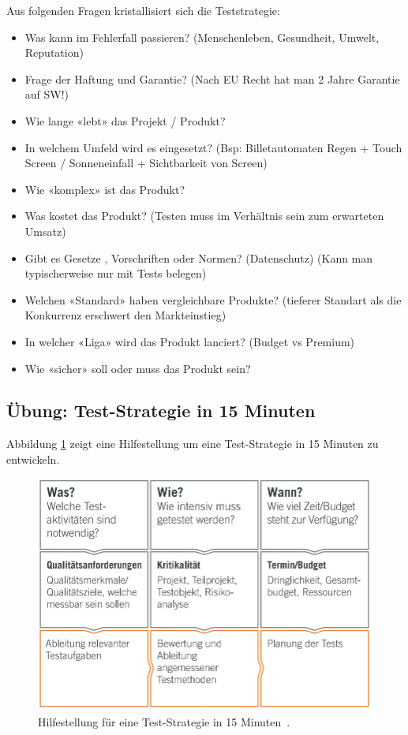 Aus folgenden Fragen kristallisiert sich die Teststrategie:
\begin{itemize}
    \item Was kann im Fehlerfall passieren? (Menschenleben, Gesundheit, Umwelt, Reputation)
    \item Frage der Haftung und Garantie? (Nach EU Recht hat man 2 Jahre Garantie auf SW!)
    \item Wie lange «lebt» das Projekt / Produkt?
    \item In welchem Umfeld wird es eingesetzt? (Bsp: Billetautomaten Regen + Touch Screen / Sonneneinfall + Sichtbarkeit von Screen)
    \item Wie «komplex» ist das Produkt?
    \item Was kostet das Produkt? (Testen muss im Verhältnis sein zum erwarteten Umsatz)
    \item Gibt es Gesetze , Vorschriften oder Normen? (Datenschutz) (Kann man typischerweise nur mit Tests belegen)
    \item Welchen «Standard» haben vergleichbare Produkte? (tieferer Standart als die Konkurrenz erschwert den Markteinstieg)
    \item In welcher «Liga» wird das Produkt lanciert? (Budget vs Premium)
    \item Wie «sicher» soll oder muss das Produkt sein?
\end{itemize}

\subsection{Übung: Test-Strategie in 15 Minuten}

Abbildung \ref{fig:Teststrategie in 15 min} zeigt eine Hilfestellung um eine Test-Strategie in 15 Minuten zu entwickeln.

\begin{figure}[H]
	\centering
	\includegraphics[width=0.6\columnwidth]{02/bilder/Teststrategie in 15 min.JPG}
	\caption{Hilfestellung für eine Test-Strategie in 15 Minuten~\cite{theNoserWayOfTesting}.}
	\label{fig:Teststrategie in 15 min}
\end{figure}

